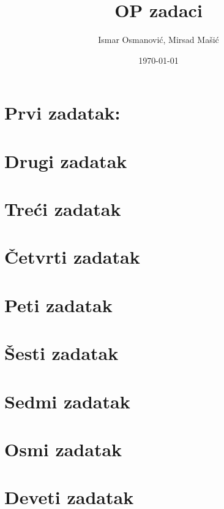 \documentclass[a4paper, 12pt]{article}
\title{\huge OP zadaci}
\author{Ismar Osmanović, Mirsad Mašić}
\date{\today}
\begin{document}
\maketitle

\section {Prvi zadatak:}


\pagebreak

\section {Drugi zadatak}



\section {Treći zadatak}




\pagebreak

\section {Četvrti zadatak}



\section {Peti zadatak}



\pagebreak

\section {Šesti zadatak}



\section {Sedmi zadatak}



\pagebreak

\section {Osmi zadatak}




\section {Deveti zadatak}


\end{document}
